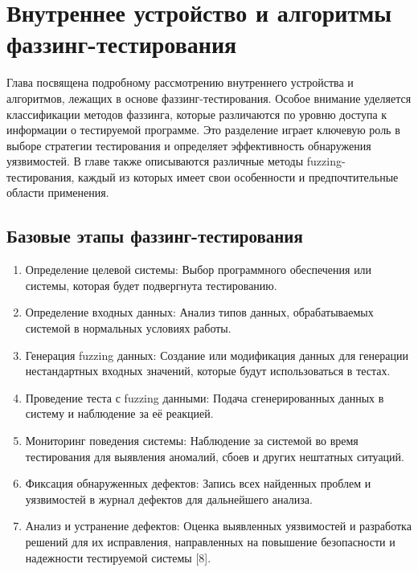 \chapter{Внутреннее устройство и алгоритмы фаззинг-тестирования} \label{ch2}
	

%
Глава посвящена подробному рассмотрению внутреннего устройства и алгоритмов, лежащих в основе фаззинг-тестирования. Особое внимание уделяется классификации методов фаззинга, которые различаются по уровню доступа к информации о тестируемой программе. Это разделение играет ключевую роль в выборе стратегии тестирования и определяет эффективность обнаружения уязвимостей. В главе также описываются различные методы fuzzing-тестирования, каждый из которых имеет свои особенности и предпочтительные области применения.


\section{Базовые этапы фаззинг-тестирования} \label{ch2:title-abbr} %
\begin{enumerate}[label=\arabic*.]
	\item Определение целевой системы: Выбор программного обеспечения или системы, которая будет подвергнута тестированию.
	\item Определение входных данных: Анализ типов данных, обрабатываемых системой в нормальных условиях работы.
	\item Генерация fuzzing данных: Создание или модификация данных для генерации нестандартных входных значений, которые будут использоваться в тестах.
	\item Проведение теста с fuzzing данными: Подача сгенерированных данных в систему и наблюдение за её реакцией.
	\item Мониторинг поведения системы: Наблюдение за системой во время тестирования для выявления аномалий, сбоев и других нештатных ситуаций.
	\item Фиксация обнаруженных дефектов: Запись всех найденных проблем и уязвимостей в журнал дефектов для дальнейшего анализа.
	\item Анализ и устранение дефектов: Оценка выявленных уязвимостей и разработка решений для их исправления, направленных на повышение безопасности и надежности тестируемой системы [8].
\end{enumerate}

